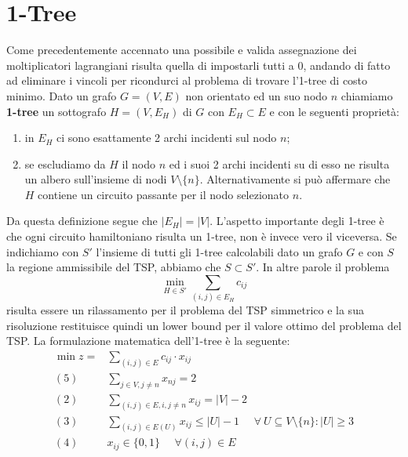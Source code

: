 \documentclass[
	article,			%
	12pt,				%
	oneside,			%
	a4paper,			%
	english,			%
	italian,				%
	sumario=tradicional,
	]{abntex2}
\begin{document}
\section{1-Tree}
Come precedentemente accennato una possibile e valida assegnazione dei moltiplicatori lagrangiani risulta quella di impostarli tutti a 0, andando di fatto ad eliminare i vincoli per ricondurci al problema di trovare l'1-tree di costo minimo.
\newline
Dato un grafo $G=(V,E)$ non orientato ed un suo nodo $n$ chiamiamo \textbf{1-tree} un sottografo $H = (V, E_H)$ di $G$ con $E_H \subset E$ e con le seguenti proprietà:
\begin{enumerate}
    \item in $E_H$ ci sono esattamente 2 archi incidenti sul nodo $n$;
    \item se escludiamo da $H$ il nodo $n$ ed i suoi 2 archi incidenti su di esso ne risulta un albero sull'insieme di nodi $V \setminus \{n\}$. Alternativamente si può affermare che $H$ contiene un circuito passante per il nodo selezionato $n$.
\end{enumerate}
Da questa definizione segue che $|E_H| = |V|$.
\newline
L'aspetto importante degli 1-tree è che ogni circuito hamiltoniano risulta un 1-tree, non è invece vero il viceversa. Se indichiamo con $S'$ l'insieme di tutti gli 1-tree calcolabili dato un grafo $G$ e con $S$ la regione ammissibile del TSP, abbiamo che $S \subset S'$.
In altre parole il problema
\begin{equation*}
    \min_{H\in S'} \sum_{(i,j) \in E_H} c_{ij}
\end{equation*}
risulta essere un rilassamento per il problema del TSP simmetrico e la sua risoluzione restituisce quindi un lower bound per il valore ottimo del problema del TSP.
\newline
La formulazione matematica dell'1-tree è la seguente:
\begin{equation*}
    \begin{split}
        \min z = & \sum_{(i,j) \in E} c_{ij} \cdot x_{ij}\\
        (5)\:\:\:\:\:\: & \sum_{j \in V, j \neq n} x_{nj} = 2 \\
        (2) \:\:\:\:\:\: & \sum_{(i,j)\in E, i, j \neq n} x_{ij} = |V|-2 \\
        (3) \:\:\:\:\:\: & \sum_{(i,j) \in E(U)} x_{ij} \leq |U| - 1 \:\:\:\:\:\: \forall\: U \subseteq V\setminus\{n\} : |U| \geq 3 \\
        (4) \:\:\:\:\:\: & x_{ij} \in \{0,1\} \:\:\:\:\:\: \forall (i,j) \in E\\
    \end{split}
\end{equation*}
\end{document}
